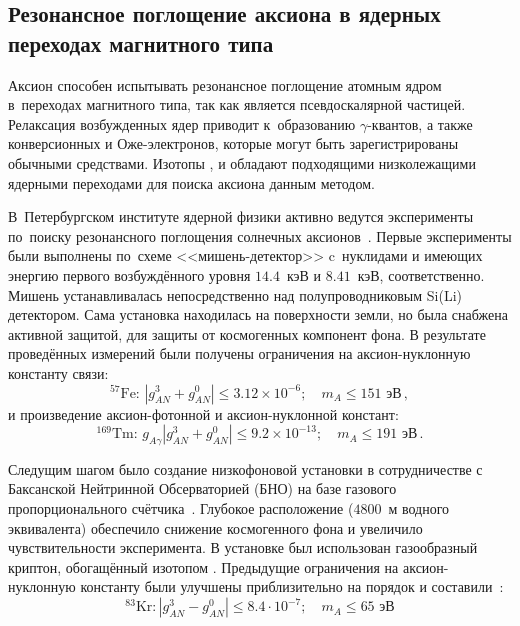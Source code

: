 \documentclass[a4paper,article,14pt]{extarticle}
\begin{document}
\subsection{Резонансное поглощение аксиона в ядерных переходах магнитного типа}
Аксион способен испытывать резонансное поглощение атомным ядром в~переходах магнитного типа, так как является псевдоскалярной частицей.
Релаксация возбужденных ядер приводит к~образованию $\gamma$-квантов, а также конверсионных и Оже-электронов, которые могут быть зарегистрированы обычными средствами.
Изотопы {\Fe}, {\Kr} и {\Tm} обладают подходящими низколежащими ядерными переходами для поиска аксиона данным методом.

В~Петербургском институте ядерной физики активно ведутся эксперименты по~поиску резонансного поглощения солнечных аксионов~\cite{Derbin2005,Derbin2007,Derbin2009,muratova2015searches,newlimits_tm}.
Первые эксперименты были выполнены по~схеме <<мишень-детектор>> c~нуклидами {\Fe} и {\Tm} имеющих энергию первого возбуждённого уровня $14.4$~кэВ и $8.41$~кэВ, соответственно.
Мишень устанавливалась непосредственно над полупроводниковым Si(Li) детектором.
Сама установка находилась на поверхности земли, но была снабжена активной защитой, для защиты от космогенных компонент фона.
В результате проведённых измерений были получены ограничения на аксион-нуклонную константу связи:
\begin{equation}
    ^{57}\text{Fe:\ }
    \left| {g_{AN}^3 + g_{AN}^0} \right| \leqslant
    3.12 \times 10^{-6};\quad m_A \leqslant 151 \text{\ эВ}\, ,
\end{equation}
и произведение аксион-фотонной и аксион-нуклонной констант:
\begin{equation}
    ^{169}\text{Tm:\ }
    g_{A\gamma} \left| {g_{AN}^3 + g_{AN}^0} \right| \leqslant
    9.2 \times {10^{ - 13}};\quad m_A \leqslant 191 \text{\ эВ}\, .
\end{equation}

Следущим шагом было создание низкофоновой установки в сотрудничестве с Баксанской Нейтринной Обсерваторией (БНО) на базе газового пропорционального счётчика~\cite{83Kr}.
Глубокое расположение ($4800$~м водного эквивалента) обеспечило снижение космогенного фона и увеличило чувствительности эксперимента.
В установке был использован газообразный криптон, обогащённый изотопом {\Kr}. Предыдущие ограничения на аксион-нуклонную константу были улучшены приблизительно на порядок и составили~\cite{Derbin_2017_Kr}:
\begin{equation}
    ^{83}\text{Kr}:
    \left| {g_{AN}^3 - g_{AN}^0} \right| \leqslant
    8.4 \cdot {10^{ - 7}};\quad {m_A} \leqslant 65 \text{\ эВ}
\end{equation}
\end{document}
